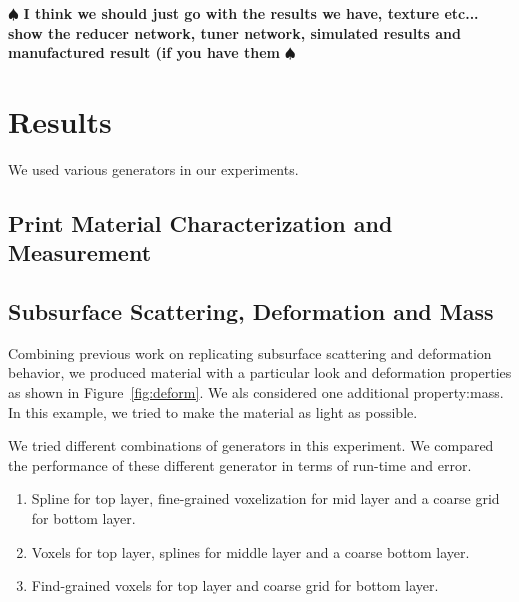 \documentclass[annual]{acmsiggraph}
\newcommand{\note}[1]{\marginpar{\LARGE $\spadesuit$}
			$\spadesuit$ {\bf #1} $\spadesuit$}
\begin{document}
\note{I think we should just go with the results we have, texture etc... show the reducer network, tuner network, simulated results and manufactured result (if you have them}
\section{Results}
We used various generators in our experiments.
\subsection{Print Material Characterization and Measurement}
\subsection{Subsurface Scattering, Deformation and Mass}
Combining previous work on replicating
subsurface scattering and deformation behavior, 
we produced
material with a particular
look and deformation properties as shown in Figure~\ref{fig:deform}.
We als considered one additional property:mass. 
In this example, we
tried to make the material as light as possible.

We tried different combinations of generators in this experiment.
We compared the performance of these different generator
in terms of run-time and error.
\begin{enumerate}
\item Spline for top layer, fine-grained voxelization for mid layer
and a coarse grid for bottom layer.
\item Voxels for top layer, splines for middle layer and a coarse
bottom layer.
\item Find-grained voxels for top layer and coarse grid for bottom layer.
\end{enumerate}
\end{document}
